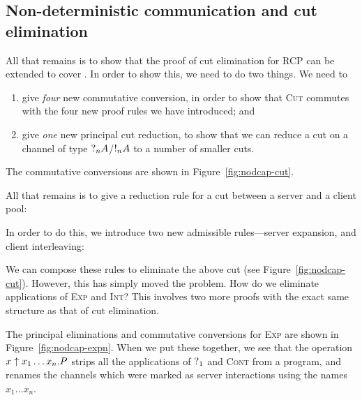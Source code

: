 \documentclass[a4paper,UKenglish]{lipics-v2016}
\begin{document}
\subsection*{Non-deterministic communication and cut elimination}
All that remains is to show that the proof of cut elimination for RCP can be
extended to cover \nodcap. In order to show this, we need to do two things.
We need to
\begin{enumerate}
\item
  give \emph{four} new commutative conversion, in order to show that
  \textsc{Cut} commutes with the four new proof rules we have introduced; and
\item
  give \emph{one} new principal cut reduction, to show that we can reduce a cut
  on a channel of type $\give[n]{A}$/$\take[n]{A}$ to a number of smaller cuts.
\end{enumerate}
The commutative conversions are shown in Figure~\ref{fig:nodcap-cut}.
%

%
All that remains is to give a reduction rule for a cut between a server and a
client pool:
\begin{prooftree}
\end{prooftree}
In order to do this, we introduce two new admissible rules---server expansion,
and client interleaving:
\begin{center}
  \begin{scprooftree*}[0.90]
  \end{scprooftree*}%
  \begin{scprooftree*}[0.90]
  \end{scprooftree*}
\end{center}
We can compose these rules to eliminate the above cut (see
Figure~\ref{fig:nodcap-cut}).
%
However, this has simply moved the problem. How do we eliminate applications of
\textsc{Exp} and \textsc{Int}? This involves two more proofs with the exact same
structure as that of cut elimination.

The principal eliminations and commutative conversions for \textsc{Exp} are
shown in Figure~\ref{fig:nodcap-expn}. When we put these together, we see that
the operation $\expn{x}{x_1 \dots x_n}P$ strips all the applications of
$\give[1]{}$ and \textsc{Cont} from a program, and renames the channels which
were marked as server interactions using the names $x_1 \dots x_n$.
%

\end{document}
